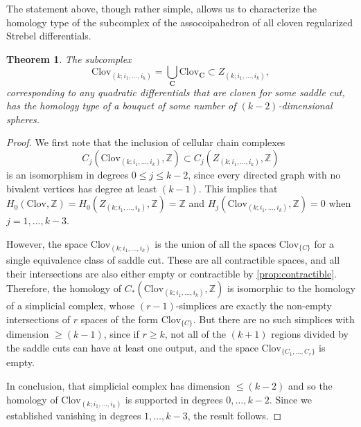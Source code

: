 \documentclass[11pt,a4paper]{amsart}
\newcommand{\ZZ}{\ensuremath{\mathbb{Z}}}
\newtheorem{theorem}{Theorem}
\theoremstyle{definition}
\begin{document}
\noindent The statement above, though rather simple, allows us to characterize the homology type of the subcomplex of the assocoipahedron of all cloven regularized Strebel differentials.
\begin{theorem}
    The subcomplex
    \[ \mathrm{Clov}_{(k;i_1,\dots,i_k)} = \bigcup_\mathbf{C} \mathrm{Clov}_\mathbf{C} \subset Z_{(k;i_1,\dots,i_k)}, \]
    corresponding to any quadratic differentials that are cloven for some saddle cut, has the homology type of a bouquet of some number of $(k-2)$-dimensional spheres.
\end{theorem}
\begin{proof}
    We first note that the inclusion of cellular chain complexes
    \[ C_j(\mathrm{Clov}_{(k;i_1,\dots,i_k)},\ZZ) \subset C_j(Z_{(k;i_1,\dots,i_k)},\ZZ) \]
    is an isomorphism in degrees $0 \le j \le k-2$, since every directed graph with no bivalent vertices has degree at least $(k-1)$. This implies that $H_0(\mathrm{Clov},\ZZ) = H_0(Z_{(k;i_1,\dots,i_k)},\ZZ) = \ZZ$ and $H_j(\mathrm{Clov}_{(k;i_1,\dots,i_k)},\ZZ) =0$ when $j = 1,\dots,k-3$.

    However, the space $\mathrm{Clov}_{(k;i_1,\dots,i_k)}$ is the union of all the spaces $\mathrm{Clov}_{\{C\}}$ for a single equivalence class of saddle cut. These are all contractible spaces, and all their intersections are also either empty or contractible by \cref{prop:contractible}. Therefore, the homology of $C_*(\mathrm{Clov}_{(k;i_1,\dots,i_k)},\ZZ)$ is isomorphic to the homology of a simplicial complex, whose $(r-1)$-simplices are exactly the non-empty intersections of $r$ spaces of the form $\mathrm{Clov}_{\{C\}}$. But there are no such simplices with dimension $\ge (k-1)$, since if $r \ge k$, not all of the $(k+1)$ regions divided by the saddle cuts can have at least one output, and the space $\mathrm{Clov}_{\{C_1,\dots,C_r\}}$ is empty. 
    
    In conclusion, that simplicial complex has dimension $\le (k-2)$ and so the homology of $\mathrm{Clov}_{(k;i_1,\dots,i_k)}$ is supported in degrees $0, \dots, k-2$. Since we established vanishing in degrees $1,\dots,k-3$, the result follows.
\end{proof}
\end{document}
